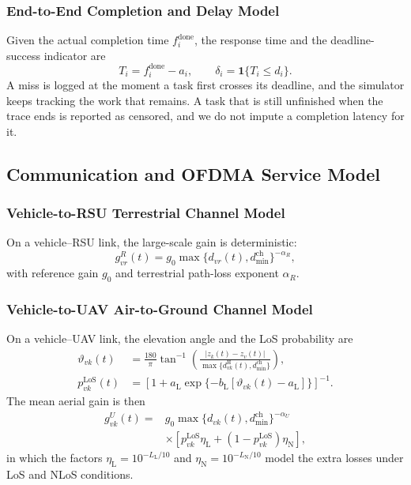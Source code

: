 \subsubsection{End-to-End Completion and Delay Model}
Given the actual completion time $f_i^{\mathrm{done}}$, the response time and
the deadline-success indicator are
\begin{equation}
T_i=f_i^{\mathrm{done}}-a_i,\qquad
\delta_i=\mathbf 1\{T_i\le d_i\}.
\label{eq:actual_latency}
\end{equation}
A miss is logged at the moment a task first crosses its deadline, and the
simulator keeps tracking the work that remains. A task that is still
unfinished when the trace ends is reported as censored, and we do not impute
a completion latency for it.

\subsection{Communication and OFDMA Service Model}
\subsubsection{Vehicle-to-RSU Terrestrial Channel Model}
On a vehicle--RSU link, the large-scale gain is deterministic:
\begin{equation}
g_{vr}^{R}(t)=g_0
\max\{d_{vr}(t),d_{\min}^{\mathrm{ch}}\}^{-\alpha_R},
\label{eq:rsu_gain}
\end{equation}
with reference gain $g_0$ and terrestrial path-loss exponent $\alpha_R$.

\subsubsection{Vehicle-to-UAV Air-to-Ground Channel Model}
On a vehicle--UAV link, the elevation angle and the LoS probability are
\begin{equation}
\begin{aligned}
\vartheta_{vk}(t)&=
\frac{180}{\pi}\tan^{-1}\!\left(
\frac{|z_k(t)-z_v(t)|}
{\max\{d_{vk}^{\mathrm H}(t),d_{\min}^{\mathrm{ch}}\}}\right),\\
p_{vk}^{\mathrm{LoS}}(t)&=
\left[1+a_{\mathrm L}
\exp\{-b_{\mathrm L}[\vartheta_{vk}(t)-a_{\mathrm L}]\}\right]^{-1}.
\end{aligned}
\label{eq:los}
\end{equation}
The mean aerial gain is then
\begin{equation}
\begin{aligned}
g_{vk}^{U}(t)={}&g_0
\max\{d_{vk}(t),d_{\min}^{\mathrm{ch}}\}^{-\alpha_U}\\
&\times\left[p_{vk}^{\mathrm{LoS}}\eta_{\mathrm L}
+(1-p_{vk}^{\mathrm{LoS}})\eta_{\mathrm N}\right],
\end{aligned}
\label{eq:uav_gain}
\end{equation}
in which the factors $\eta_{\mathrm L}=10^{-L_{\mathrm L}/10}$ and
$\eta_{\mathrm N}=10^{-L_{\mathrm N}/10}$ model the extra losses under LoS
and NLoS conditions.

